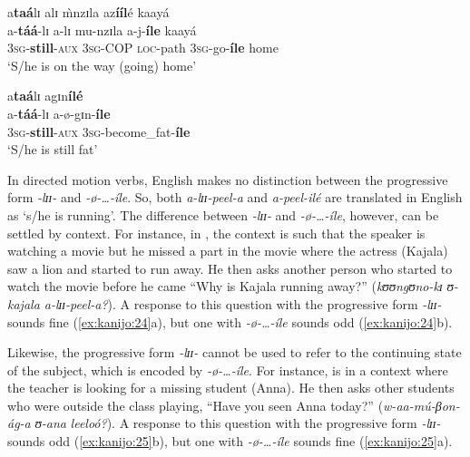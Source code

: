 \documentclass[output=paper,newtxmath,modfonts,nonflat,draftmode]{langsci/langscibook}
\begin{document}
\ea \label{ex:kanijo:22}
\glll a\textbf{taá}lɪ  alɪ  \`{m}nzɪla  az\textbf{ííl}é kaayá\\
  a-\textbf{táá}-lɪ           a-lɪ           mu-nzɪla  a-j-\textbf{íle}        kaayá\\
  3\textsc{sg}-\textbf{still}-\textsc{aux} 3\textsc{sg}-COP \textsc{loc}-path 3\textsc{sg}-go-\textbf{íle} home\\
\glt   ‘S/he is on the way (going) home’
\z

\ea \label{ex:kanijo:23}
\glll a\textbf{taá}lɪ              agɪn\textbf{ílé} \\
  a-\textbf{táá}-lɪ            a-ø-gɪn-\textbf{íle}\\
  3\textsc{sg}-\textbf{still}-\textsc{aux} 3\textsc{sg}-become\_fat-\textbf{íle}\\
\glt   ‘S/he is still fat’
\z


In directed motion verbs, English makes no distinction between the progressive form \textit{-lɪɪ-} and \textit{-ø-…-íle}. So, both \textit{a-lɪɪ-peel-a} and \textit{a-peel-ilé} are translated in English as ‘s/he is running’. The difference between \textit{-lɪɪ-} and \textit{-ø-…-íle}, however, can be settled by context. For instance, in , the context is such that the speaker is watching a movie but he missed a part in the movie where the actress (Kajala) saw a lion and started to run away. He then asks another person who started to watch the movie before he came “Why is Kajala running away?” (\textit{kʊʊngʊno-kɪ} \textit{ʊ-kajala a-lɪɪ-peel-a?}). A response to this question with the progressive form \textit{-lɪɪ-} sounds fine (\ref{ex:kanijo:24}a), but one with \textit{-ø-…-íle} sounds odd (\ref{ex:kanijo:24}b). 

\ea \label{ex:kanijo:24}

\z
\z

Likewise, the progressive form \textit{-lɪɪ-} cannot be used to refer to the continuing state of the subject, which is encoded by \textit{-ø-…-íle}. For instance,  is in a context where the teacher is looking for a missing student (Anna). He then asks other students who were outside the class playing, “Have you seen Anna today?” (\textit{w-aa-mú-βon-ág-a} \textit{ʊ-ana} \textit{leeloó?}). A response to this question with the progressive form \textit{-lɪɪ-} sounds odd (\ref{ex:kanijo:25}b), but one with \textit{-ø-…-íle} sounds fine (\ref{ex:kanijo:25}a).
\end{document}
